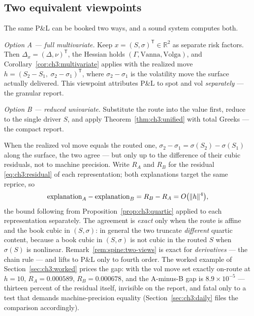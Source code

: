 \documentclass[11pt]{book}
\theoremstyle{plain}
\theoremstyle{definition}
\theoremstyle{remark}
\newcommand{\vega}{\nu}                          %
\newcommand{\Vanna}{\mathrm{Vanna}}
\newcommand{\Volga}{\mathrm{Volga}}
\DeclarePairedDelimiter{\norm}{\lVert}{\rVert}
\begin{document}
\subsection{Two equivalent viewpoints}\label{sec:ch3:two-views}

The same P\&L can be booked two ways, and a sound system computes both.

\emph{Option A --- full multivariate.} Keep $x = (S, \sigma)^{\mathsf T} \in
\mathbb{R}^2$ as separate risk factors. Then $\Delta_x = (\Delta,
\vega)^{\mathsf T}$, the Hessian holds $(\Gamma, \Vanna, \Volga)$, and
Corollary~\ref{cor:ch3:multivariate} applies with the realized move
$h = (S_2 - S_1,\; \sigma_2 - \sigma_1)^{\mathsf T}$, where $\sigma_2 -
\sigma_1$ is the volatility move the surface actually delivered. This
viewpoint attributes P\&L to spot and vol \emph{separately} --- the granular
report.

\emph{Option B --- reduced univariate.} Substitute the route into the value
first, reduce to the single driver $S$, and apply
Theorem~\ref{thm:ch3:unified} with total Greeks --- the compact report.

When the realized vol move equals the routed one,
$\sigma_2 - \sigma_1 = \sigma(S_2) - \sigma(S_1)$ along the surface, the two
agree --- but only up to the difference of their cubic residuals, not to
machine precision. Write $R_A$ and $R_B$ for the residual
\eqref{eq:ch3:residual} of each representation; both explanations target the
same reprice, so
\[
  \text{explanation}_A - \text{explanation}_B = R_B - R_A
  = O\bigl(\norm{h}^4\bigr),
\]
the bound following from Proposition~\ref{prop:ch3:quartic} applied to each
representation separately. The agreement is \emph{exact} only when the route
is affine and the book cubic in $(S, \sigma)$: in general the two truncate
\emph{different} quartic content, because a book cubic in $(S, \sigma)$ is
not cubic in the routed $S$ when $\sigma(S)$ is nonlinear.
Remark~\ref{rem:spine:two-views} is exact for \emph{derivatives} --- the
chain rule --- and lifts to P\&L only to fourth order. The worked example of
Section~\ref{sec:ch3:worked} prices the gap: with the vol move set exactly
on-route at $h = 10$, $R_A = 0.000589$, $R_B = 0.000678$, and the A-minus-B
gap is $8.9\times10^{-5}$ --- thirteen percent of the residual itself,
invisible on the report, and fatal only to a test that demands
machine-precision equality (Section~\ref{sec:ch3:daily} files the comparison
accordingly).
\end{document}
